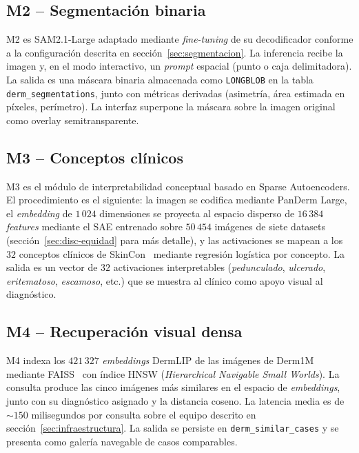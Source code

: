 \subsection{M2 -- Segmentación binaria}
\label{sec:dermapixel-m2}

M2 es SAM2.1-Large adaptado mediante \emph{fine-tuning} de su
decodificador conforme a la
configuración descrita en sección~\ref{sec:segmentacion}. La inferencia
recibe la imagen y, en el modo interactivo, un \emph{prompt}
espacial (punto o caja delimitadora). La salida es una máscara
binaria almacenada como \texttt{LONGBLOB} en la tabla
\texttt{derm\_segmentations}, junto con métricas derivadas
(asimetría, área estimada en píxeles, perímetro). La interfaz
superpone la máscara sobre la imagen original como overlay
semitransparente.

\subsection{M3 -- Conceptos clínicos}
\label{sec:dermapixel-m3}

M3 es el módulo de interpretabilidad conceptual basado en Sparse
Autoencoders. El procedimiento es el siguiente: la imagen se
codifica mediante PanDerm Large, el \emph{embedding} de
$1\,024$ dimensiones se proyecta al espacio disperso de
$16\,384$ \emph{features} mediante el SAE entrenado sobre
$50\,454$ imágenes de siete datasets (sección~\ref{sec:disc-equidad}
para más detalle), y las activaciones se mapean a los $32$
conceptos clínicos de SkinCon~\cite{skincon} mediante regresión
logística por concepto. La salida es un vector de $32$
activaciones interpretables (\emph{pedunculado}, \emph{ulcerado},
\emph{eritematoso}, \emph{escamoso}, etc.) que se muestra al
clínico como apoyo visual al diagnóstico.

\subsection{M4 -- Recuperación visual densa}
\label{sec:dermapixel-m4}

M4 indexa los $421\,327$ \emph{embeddings} DermLIP de las
imágenes de Derm1M mediante FAISS~\cite{faiss2019} con índice HNSW
(\emph{Hierarchical Navigable Small Worlds}). La consulta produce
las cinco imágenes más similares en el espacio de
\emph{embeddings}, junto con su diagnóstico asignado y la distancia
coseno. La latencia media es de $\sim 150$ milisegundos por
consulta sobre el equipo descrito en sección~\ref{sec:infraestructura}.
La salida se persiste en \texttt{derm\_similar\_cases} y se
presenta como galería navegable de casos comparables.


